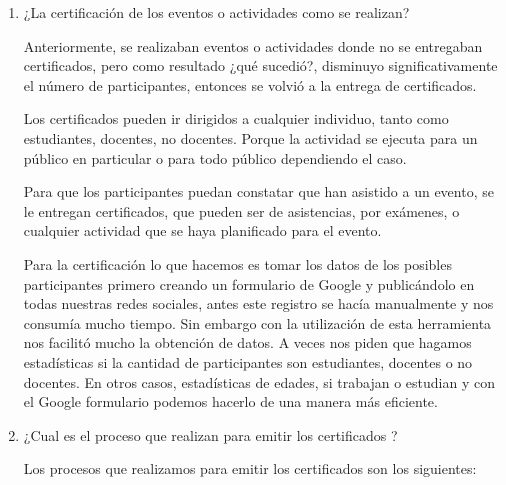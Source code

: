 \begin{enumerate}
    

    \item ¿La certificación de los eventos o actividades como se realizan?
    
   
    Anteriormente, se realizaban eventos o actividades donde no se entregaban
    certificados, pero como resultado ¿qué sucedió?, disminuyo significativamente
    el número de participantes, entonces se volvió a la entrega de certificados.

    Los certificados pueden ir dirigidos a cualquier individuo, tanto 
    como estudiantes, docentes, no docentes. Porque la actividad 
    se ejecuta para un público en particular o para todo público dependiendo el caso.

    Para que los participantes puedan constatar que han asistido a un evento, se 
    le entregan certificados, que pueden ser de asistencias, por exámenes, o 
    cualquier actividad que se haya planificado para el evento.

    Para la certificación lo que hacemos es tomar los datos de los posibles participantes
    primero creando un formulario de Google  y publicándolo en todas nuestras redes sociales,
    antes este registro se hacía manualmente y nos consumía mucho tiempo. Sin embargo
    con la utilización de esta herramienta nos facilitó mucho la obtención de datos.
    A veces nos piden que hagamos estadísticas si la cantidad de participantes 
    son estudiantes, docentes o no docentes. En otros casos, estadísticas de edades, 
    si trabajan o estudian y con el Google formulario podemos hacerlo de una manera
    más eficiente. 



    \item ¿Cual es el proceso que realizan para emitir los certificados ?
 
   
    Los procesos que realizamos para emitir los certificados son los siguientes:


\end{enumerate}
